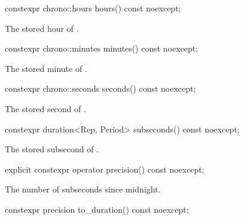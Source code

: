 %
\begin{itemdecl}
constexpr chrono::hours hours() const noexcept;
\end{itemdecl}

\begin{itemdescr}
\pnum
\returns
The stored hour of .
\end{itemdescr}

%
\begin{itemdecl}
constexpr chrono::minutes minutes() const noexcept;
\end{itemdecl}

\begin{itemdescr}
\pnum
\returns
The stored minute of .
\end{itemdescr}

%
\begin{itemdecl}
constexpr chrono::seconds seconds() const noexcept;
\end{itemdecl}

\begin{itemdescr}
\pnum
\returns
The stored second of .
\end{itemdescr}

%
\begin{itemdecl}
constexpr duration<Rep, Period> subseconds() const noexcept;
\end{itemdecl}

\begin{itemdescr}
\pnum
\returns
The stored subsecond of .
\end{itemdescr}

%
\begin{itemdecl}
explicit constexpr operator precision() const noexcept;
\end{itemdecl}

\begin{itemdescr}
\pnum
\returns
The number of subseconds since midnight.
\end{itemdescr}

%
\begin{itemdecl}
constexpr precision to_duration() const noexcept;
\end{itemdecl}

